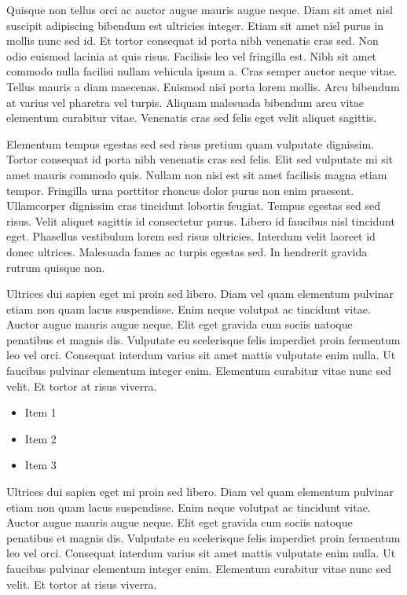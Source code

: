 \documentclass[10pt]{article} %
\newenvironment{BoxedInternal}[1][]
{%
  \begin{changemargin}{0cm}{0cm}%
    \begin{mdframed}[roundcorner=5pt,backgroundcolor=swred,outermargin  =-0.5in,innermargin =-0.5in, topline=false, bottomline=false, rightline=false, leftline=false,#1]
    }{%
    \end{mdframed}%
  \end{changemargin}%
}
\newcommand*{\noind}{\setlength{\parindent}{0cm}} %
\newcommand{\bighdr}[2][]{%
  \vspace{2pt}
  \begin{BoxedInternal}[#1]{}
    \color{white}\huge\bfseries\headingfont\filcenter{#2}
  \end{BoxedInternal}\vspace{-8pt}%
}
\begin{document}
\begin{multicols}{2}
  Quisque non tellus orci ac auctor augue mauris augue neque. Diam sit amet nisl suscipit adipiscing bibendum est ultricies integer. Etiam sit amet nisl purus in mollis nunc sed id. Et tortor consequat id porta nibh venenatis cras sed. Non odio euismod lacinia at quis risus. Facilisis leo vel fringilla est. Nibh sit amet commodo nulla facilisi nullam vehicula ipsum a. Cras semper auctor neque vitae. Tellus mauris a diam maecenas. Euismod nisi porta lorem mollis. Arcu bibendum at varius vel pharetra vel turpis. Aliquam malesuada bibendum arcu vitae elementum curabitur vitae. Venenatis cras sed felis eget velit aliquet sagittis.

  \bighdr{OTHER STUFF}
  {\noind
    Elementum tempus egestas sed sed risus pretium quam vulputate dignissim. Tortor consequat id porta nibh venenatis cras sed felis. Elit sed vulputate mi sit amet mauris commodo quis. Nullam non nisi est sit amet facilisis magna etiam tempor. Fringilla urna porttitor rhoncus dolor purus non enim praesent. Ullamcorper dignissim cras tincidunt lobortis feugiat. Tempus egestas sed sed risus. Velit aliquet sagittis id consectetur purus. Libero id faucibus nisl tincidunt eget. Phasellus vestibulum lorem sed risus ultricies. Interdum velit laoreet id donec ultrices. Malesuada fames ac turpis egestas sed. In hendrerit gravida rutrum quisque non.
  }

  Ultrices dui sapien eget mi proin sed libero. Diam vel quam elementum pulvinar etiam non quam lacus suspendisse. Enim neque volutpat ac tincidunt vitae. Auctor augue mauris augue neque. Elit eget gravida cum sociis natoque penatibus et magnis dis. Vulputate eu scelerisque felis imperdiet proin fermentum leo vel orci. Consequat interdum varius sit amet mattis vulputate enim nulla. Ut faucibus pulvinar elementum integer enim. Elementum curabitur vitae nunc sed velit. Et tortor at risus viverra.

  \begin{itemize} %
  \item Item 1
  \item Item 2
  \item Item 3
  \end{itemize}

  Ultrices dui sapien eget mi proin sed libero. Diam vel quam elementum pulvinar etiam non quam lacus suspendisse. Enim neque volutpat ac tincidunt vitae. Auctor augue mauris augue neque. Elit eget gravida cum sociis natoque penatibus et magnis dis. Vulputate eu scelerisque felis imperdiet proin fermentum leo vel orci. Consequat interdum varius sit amet mattis vulputate enim nulla. Ut faucibus pulvinar elementum integer enim. Elementum curabitur vitae nunc sed velit. Et tortor at risus viverra.


\end{multicols}
\end{document}
